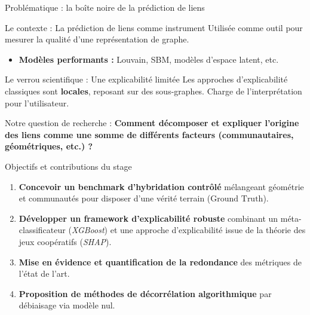\documentclass[10pt]{beamer}
\begin{document}
\begin{frame}{Problématique : la boîte noire de la prédiction de liens}
    \begin{block}{Le contexte : La prédiction de liens comme instrument}
        Utilisée comme outil pour mesurer la qualité d'une représentation de graphe.
        \begin{itemize}
            \item \textbf{Modèles performants :} Louvain, SBM, modèles d'espace latent, etc.
        \end{itemize}
    \end{block}

    \vspace{0.3cm}

    \begin{alertblock}{Le verrou scientifique : Une explicabilité limitée}
        Les approches d'explicabilité classiques sont \textbf{locales}, reposant sur des sous-graphes.
        Charge de l'interprétation pour l'utilisateur.
    \end{alertblock}

    \vspace{0.3cm}

    \begin{exampleblock}{Notre question de recherche :}
        \centering
        \smallskip
        \textbf{Comment décomposer et expliquer l'origine des liens comme une somme de différents facteurs (communautaires, géométriques, etc.) ?}
        \smallskip
    \end{exampleblock}
\end{frame}

\begin{frame}{Objectifs et contributions du stage}
    \begin{enumerate}
        \item \textbf{Concevoir un benchmark d'hybridation contrôlé} mélangeant géométrie et communautés pour disposer d'une vérité terrain ($\text{Ground Truth}$).
        \item \textbf{Développer un framework d'explicabilité robuste} combinant un méta-classificateur (\textit{XGBoost}) et une approche d'explicabilité issue de la théorie des jeux coopératifs (\textit{SHAP}).
        \item \textbf{Mise en évidence et quantification de la redondance} des métriques de l'état de l'art.
        \item \textbf{Proposition de méthodes de décorrélation algorithmique} par débiaisage via modèle nul.
    \end{enumerate}
\end{frame}
\end{document}

